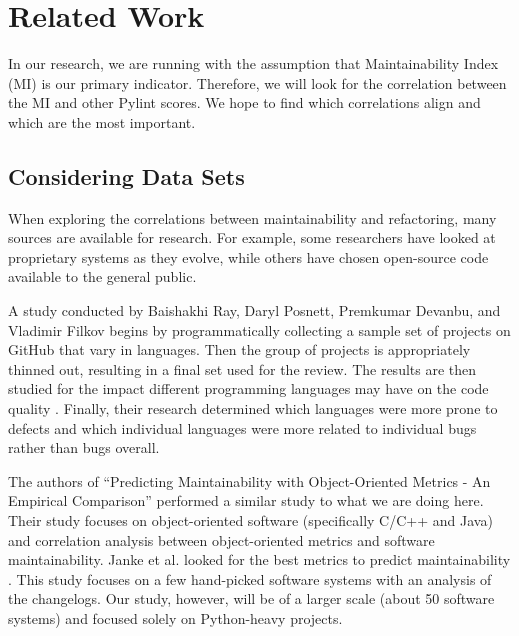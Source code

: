 
\section{Related Work} \label{sectionRelatedWork}

In our research, we are running with the assumption that Maintainability Index (MI) is our primary indicator. Therefore, we will look for the correlation between the MI and other Pylint scores. We hope to find which correlations align and which are the most important.

\subsection{Considering Data Sets}

When exploring the correlations between maintainability and refactoring, many sources are available for research. For example, some researchers have looked at proprietary systems as they evolve, while others have chosen open-source code available to the general public.

A study conducted by Baishakhi Ray, Daryl Posnett, Premkumar Devanbu, and Vladimir Filkov begins by programmatically collecting a sample set of projects on GitHub that vary in languages. Then the group of projects is appropriately thinned out, resulting in a final set used for the review. The results are then studied for the impact different programming languages may have on the code quality \cite{baishakhi:2017}. Finally, their research determined which languages were more prone to defects and which individual languages were more related to individual bugs rather than bugs overall.

The authors of ``Predicting Maintainability with Object-Oriented Metrics - An Empirical Comparison'' performed a similar study to what we are doing here. Their study focuses on object-oriented software (specifically C/C++ and Java) and correlation analysis between object-oriented metrics and software maintainability. Janke et al. looked for the best metrics to predict maintainability \cite{janke:2003}. This study focuses on a few hand-picked software systems with an analysis of the changelogs. Our study, however, will be of a larger scale (about 50 software systems) and focused solely on Python-heavy projects.

